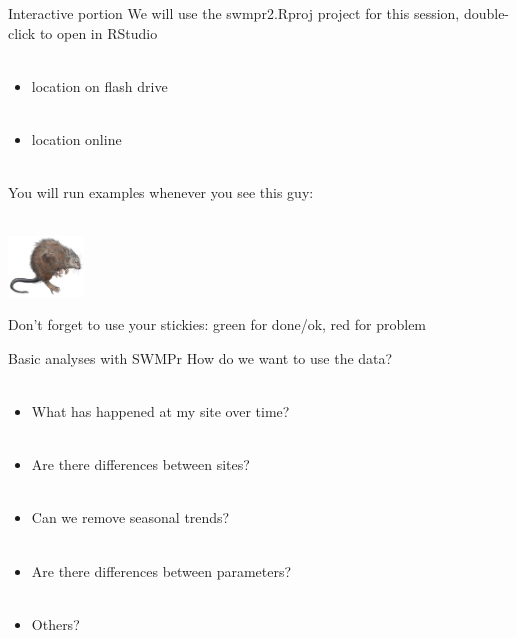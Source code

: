 \documentclass[xcolor=dvipsnames,serif]{beamer}\usepackage[]{graphicx}\usepackage[]{color}
\begin{document}
\begin{frame}{Interactive portion}
\onslide<+->
We will use the swmpr2.Rproj project for this session, double-click to open in RStudio \\~\\
\begin{itemize}
\item location on flash drive\\~\\
\item location online \\~\\
\end{itemize}
\onslide<+->
You will run examples whenever you see this guy: \\~\\
\centerline{\includegraphics[width = 0.15\textwidth]{imgs/swmprat.png}} 
Don't forget to use your stickies: {\color{green} green} for done/ok, {\color{red} red} for problem
\end{frame}

\begin{frame}[t]{Basic analyses with SWMPr}
\onslide<+->
How do we want to use the data? \\~\\
\onslide<+->
\begin{itemize}
\item What has happened at my site over time? \\~\\
\item Are there differences between sites? \\~\\
\item Can we remove seasonal trends? \\~\\
\item Are there differences between parameters? \\~\\
\item Others?
\end{itemize}
\end{frame}
\end{document}
